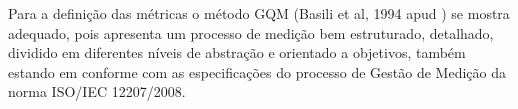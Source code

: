 Para a definição das métricas o método GQM (Basili et al, 1994 apud \cite{solingen99}) se mostra adequado, 
pois apresenta um processo de medição bem estruturado, detalhado, dividido em diferentes níveis de abstração
e orientado a objetivos, também estando em conforme com as especificações do processo de Gestão de Medição
da norma ISO/IEC 12207/2008.

